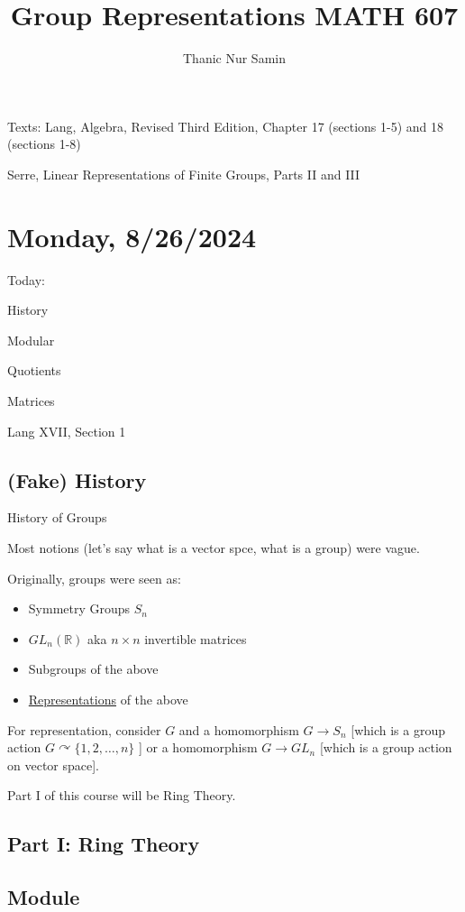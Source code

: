 \documentclass{article}
\title{Group Representations MATH 607}
\author{Thanic Nur Samin}
\date{\vspace{-5ex}}
\theoremstyle{definition}
\begin{document}
\maketitle

Texts: Lang, Algebra, Revised Third Edition, Chapter 17 (sections 1-5) and 18 (sections 1-8)

Serre, Linear Representations of Finite Groups, Parts II and III

\section*{Monday, 8/26/2024}

Today:

History

Modular

Quotients

Matrices

Lang XVII, Section 1

\subsection*{(Fake) History}

History of Groups 

Most notions (let's say what is a vector spce, what is a group) were vague.

Originally, groups were seen as:

\begin{itemize}
    \item Symmetry Groups \(S_n\) 
    \item \(GL_n(\mathbb{R})\) aka \(n \times n\) invertible matrices
    \item Subgroups of the above
    \item \underline{Representations} of the above
\end{itemize}

For representation, consider \(G\) and a homomorphism \(G \to S_n\) [which is a group action \(G \curvearrowright \{ 1,2,\dots ,n \} \) ] or a homomorphism \(G \to GL_n\) [which is a group action on vector space].

Part I of this course will be Ring Theory.

\subsection*{Part I: Ring Theory}

\subsection*{Module}
\end{document}
